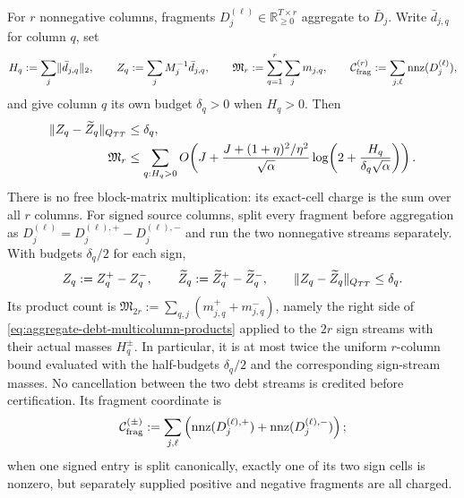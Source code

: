 \begin{theorem}
For $r$ nonnegative columns, fragments
$D_j^{(\ell)}\in\mathbb R_{\geq0}^{T\times r}$ aggregate to
$\bar D_j$.  Write $\bar d_{j,q}$ for column $q$, set
\begin{equation}
 H_q:=\sum_j\lVert\bar d_{j,q}\rVert_2,
 \qquad
 Z_q:=\sum_jM_j^{-1}\bar d_{j,q},
 \qquad
 \mathfrak M_r:=\sum_{q=1}^r\sum_jm_{j,q},
 \qquad
 \mathcal C_{\rm frag}^{(r)}
 :=\sum_{j,\ell}\operatorname{nnz}(D_j^{(\ell)}),
 \label{eq:aggregate-debt-multicolumn-data}
\end{equation}
and give column $q$ its own budget $\delta_q>0$ when $H_q>0$.
Then
\begin{align}
 \lVert Z_q-\widetilde Z_q\rVert_{Q_{TT}}&\leq\delta_q,
 \label{eq:aggregate-debt-multicolumn-error}\\
 \mathfrak M_r
 &\leq\sum_{q:H_q>0}
 O\!\left(
  J+\frac{J+(1+\eta)^2/\eta^2}{\sqrt\alpha}
  \log\!\left(2+\frac{H_q}{\delta_q\sqrt\alpha}\right)
 \right).
 \label{eq:aggregate-debt-multicolumn-products}
\end{align}
There is no free block-matrix multiplication: its exact-cell charge is the
sum over all $r$ columns.  For signed source columns, split every fragment
before aggregation as
$D_j^{(\ell)}=D_j^{(\ell),+}-D_j^{(\ell),-}$ and run the two nonnegative
streams separately.  With budgets $\delta_q/2$ for each sign,
\begin{equation}
 Z_q:=Z_q^+-Z_q^-,
 \qquad
 \widetilde Z_q:=\widetilde Z_q^+-\widetilde Z_q^-,
 \qquad
 \lVert Z_q-\widetilde Z_q\rVert_{Q_{TT}}\leq\delta_q.
 \label{eq:aggregate-debt-signed-split}
\end{equation}
Its product count is
$\mathfrak M_{2r}:=\sum_{q,j}(m_{j,q}^++m_{j,q}^-)$, namely the
right side of \cref{eq:aggregate-debt-multicolumn-products} applied to the
$2r$ sign streams with their actual masses $H_q^\pm$.  In particular, it is
at most twice the uniform $r$-column bound evaluated with the half-budgets
$\delta_q/2$ and the corresponding sign-stream masses.  No cancellation
between the two debt streams is credited before certification.  Its fragment coordinate is
\begin{equation*}
 \mathcal C_{\rm frag}^{(\pm)}
 :=\sum_{j,\ell}
 \left(
  \operatorname{nnz}(D_j^{(\ell),+})
  +\operatorname{nnz}(D_j^{(\ell),-})
 \right);
\end{equation*}
when one signed entry is split canonically, exactly one of its two sign cells
is nonzero, but separately supplied positive and negative fragments are all
charged.


\end{theorem}
